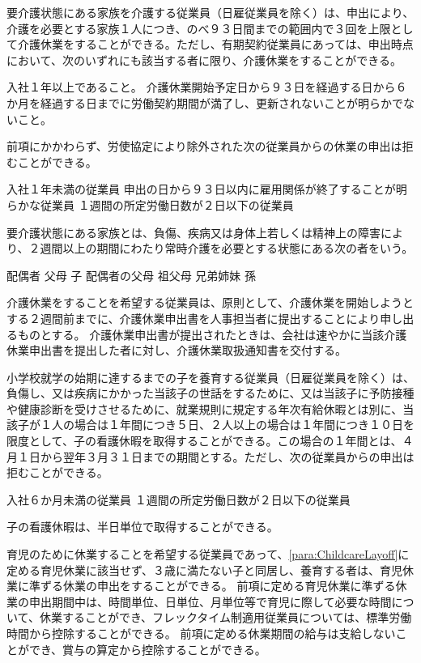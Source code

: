 \documentclass[10pt,a4paper]{jsarticle}
\begin{document}
要介護状態にある家族を介護する従業員（日雇従業員を除く）は、申出により、介護を必要とする家族１人につき、のべ９３日間までの範囲内で３回を上限として介護休業をすることができる。ただし、有期契約従業員にあっては、申出時点において、次のいずれにも該当する者に限り、介護休業をすることができる。
\label{para:NursingLayoff}
\begin{enumerate}
    \itm 入社１年以上であること。
    \itm 介護休業開始予定日から９３日を経過する日から６か月を経過する日までに労働契約期間が満了し、更新されないことが明らかでないこと。
\end{enumerate}
\term 前項にかかわらず、労使協定により除外された次の従業員からの休業の申出は拒むことができる。
\begin{enumerate}
    \itm 入社１年未満の従業員
    \itm 申出の日から９３日以内に雇用関係が終了することが明らかな従業員
    \itm １週間の所定労働日数が２日以下の従業員
\end{enumerate}
\term 要介護状態にある家族とは、負傷、疾病又は身体上若しくは精神上の障害により、２週間以上の期間にわたり常時介護を必要とする状態にある次の者をいう。
\begin{enumerate}
    \itm 配偶者
    \itm 父母
    \itm 子
    \itm 配偶者の父母
    \itm 祖父母
    \itm 兄弟姉妹
    \itm 孫
\end{enumerate}
\term 介護休業をすることを希望する従業員は、原則として、介護休業を開始しようとする２週間前までに、介護休業申出書を人事担当者に提出することにより申し出るものとする。
\term 介護休業申出書が提出されたときは、会社は速やかに当該介護休業申出書を提出した者に対し、介護休業取扱通知書を交付する。

小学校就学の始期に達するまでの子を養育する従業員（日雇従業員を除く）は、負傷し、又は疾病にかかった当該子の世話をするために、又は当該子に予防接種や健康診断を受けさせるために、就業規則に規定する年次有給休暇とは別に、当該子が１人の場合は１年間につき５日、２人以上の場合は１年間につき１０日を限度として、子の看護休暇を取得することができる。この場合の１年間とは、４月１日から翌年３月３１日までの期間とする。ただし、次の従業員からの申出は拒むことができる。
\label{para:ChildNursingAbsence}
\begin{enumerate}
    \itm 入社６か月未満の従業員
    \itm １週間の所定労働日数が２日以下の従業員
\end{enumerate}
\term 子の看護休暇は、半日単位で取得することができる。

育児のために休業することを希望する従業員であって、\ref{para:ChildcareLayoff}に定める育児休業に該当せず、３歳に満たない子と同居し、養育する者は、育児休業に準ずる休業の申出をすることができる。
\term
前項に定める育児休業に準ずる休業の申出期間中は、時間単位、日単位、月単位等で育児に際して必要な時間について、休業することができ、フレックタイム制適用従業員については、標準労働時間から控除することができる。
\term
前項に定める休業期間の給与は支給しないことができ、賞与の算定から控除することができる。
\end{document}
